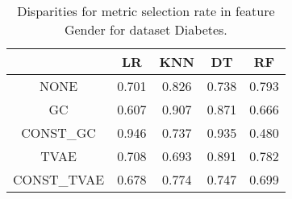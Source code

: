 \begin{table}
\caption{Disparities for metric selection rate in feature Gender for dataset Diabetes.}
\label{tab:disp-DIABETES-Gender-selection_rate}
\begin{tabular}{ccccc}
\toprule
 & LR & KNN & DT & RF \\
\midrule
NONE & 0.701 & 0.826 & 0.738 & 0.793 \\
GC & 0.607 & 0.907 & 0.871 & 0.666 \\
CONST\_GC & 0.946 & 0.737 & 0.935 & 0.480 \\
TVAE & 0.708 & 0.693 & 0.891 & 0.782 \\
CONST\_TVAE & 0.678 & 0.774 & 0.747 & 0.699 \\
\bottomrule
\end{tabular}
\end{table}
